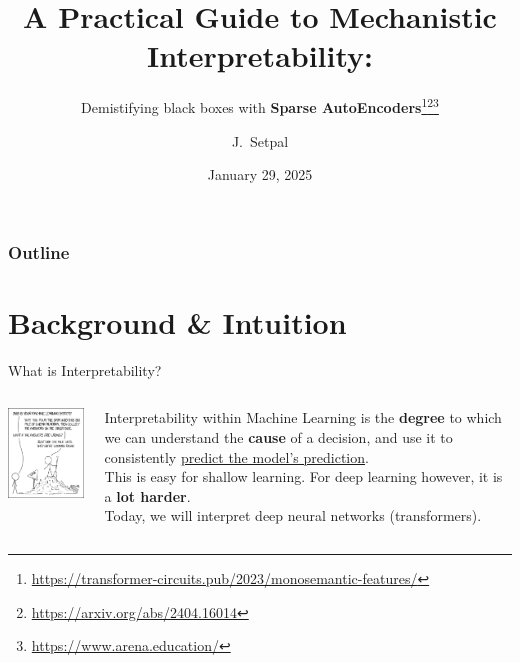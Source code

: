\documentclass{beamer}
\title[Mechanistic Interpretability]{A Practical Guide to Mechanistic Interpretability:}
\subtitle{Demistifying black boxes with \textbf{Sparse AutoEncoders}\thanks{\tiny \url{https://transformer-circuits.pub/2023/monosemantic-features/}}\thanks{\tiny \url{https://arxiv.org/abs/2404.16014}}\thanks{\tiny{\url{https://www.arena.education/}}}}
\author[ECE ML Reading Group] %
{J.~Setpal}
\date{January 29, 2025}
\begin{document}
\frame{\titlepage}


\begin{frame}
\frametitle{Outline}
\tableofcontents
\end{frame}

\section{Background \& Intuition}
\begin{frame}{What is Interpretability?}
	\begin{columns}
		\begin{column}{0.5\textwidth}
			\begin{center}
				\includegraphics[width=5cm]{img/1838} \pause
			\end{center}
		\end{column}
		\begin{column}{0.5\textwidth}
			Interpretability within Machine Learning is the \textbf{degree} to which we can understand the \textbf{cause} of a decision, and use it to consistently \underline{predict the model's prediction}. \pause \newline \\

			This is easy for shallow learning. \pause For deep learning however, it is a \textbf{lot harder}. \pause \newline \\
			Today, we will interpret deep neural networks (transformers). 
		\end{column}
	\end{columns}
\end{frame}
\end{document}

